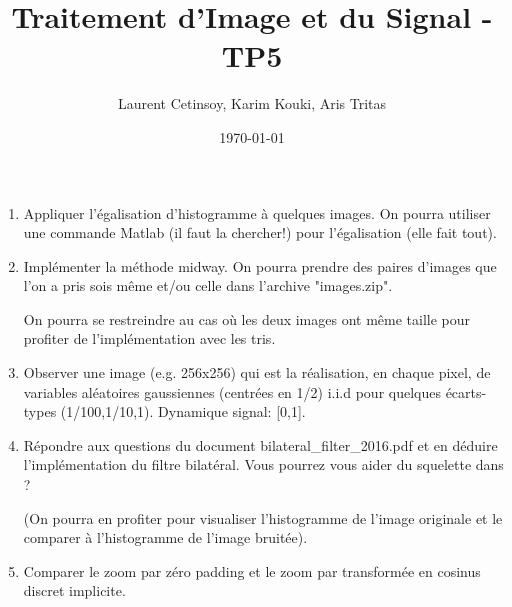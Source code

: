 \documentclass{article}
\title{Traitement d'Image et du Signal - TP5}
\author{Laurent Cetinsoy, Karim Kouki, Aris Tritas }
\date{\today}
\begin{document}
\maketitle
\begin{enumerate}
\item Appliquer l'égalisation d'histogramme à quelques images. On pourra
utiliser une commande Matlab (il faut la chercher!) pour l'égalisation
(elle fait tout).
\item Implémenter la méthode midway. On pourra prendre des paires d'images
que l'on a pris sois même et/ou celle dans l'archive "images.zip".

On pourra se restreindre au cas où les deux images ont même taille pour
profiter de l'implémentation avec les tris.

\item  Observer une image (e.g. 256x256) qui est la réalisation, en chaque
pixel, de variables aléatoires gaussiennes (centrées en 1/2) i.i.d pour
quelques écarts-types (1/100,1/10,1). Dynamique signal: [0,1].

\item Répondre aux questions du document bilateral\_filter\_2016.pdf et en
déduire l'implémentation du filtre bilatéral. Vous pourrez vous aider du
squelette dans ?

(On pourra en profiter pour visualiser l'histogramme de l'image
originale et le comparer à l'histogramme de l'image bruitée).

\item Comparer le zoom par zéro padding et le zoom par transformée en
cosinus discret implicite.
\end{enumerate}
\end{document}
